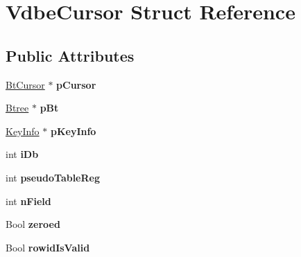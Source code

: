 \hypertarget{struct_vdbe_cursor}{\section{Vdbe\-Cursor Struct Reference}
\label{struct_vdbe_cursor}
}
\subsection*{Public Attributes}
\begin{DoxyCompactItemize}
\item 
\hypertarget{struct_vdbe_cursor_a9ecb4ab9f7374f92da69f03fc336c293}{\hyperlink{struct_bt_cursor}{Bt\-Cursor} $\ast$ {\bfseries p\-Cursor}}\label{struct_vdbe_cursor_a9ecb4ab9f7374f92da69f03fc336c293}

\item 
\hypertarget{struct_vdbe_cursor_a287db3fe6d84102fad3d69494b565e9b}{\hyperlink{struct_btree}{Btree} $\ast$ {\bfseries p\-Bt}}\label{struct_vdbe_cursor_a287db3fe6d84102fad3d69494b565e9b}

\item 
\hypertarget{struct_vdbe_cursor_a72a6c26ab2ab2ad699dfb45703ea4765}{\hyperlink{struct_key_info}{Key\-Info} $\ast$ {\bfseries p\-Key\-Info}}\label{struct_vdbe_cursor_a72a6c26ab2ab2ad699dfb45703ea4765}

\item 
\hypertarget{struct_vdbe_cursor_a1215b7b0d1bbd882d6bfb8b118712d89}{int {\bfseries i\-Db}}\label{struct_vdbe_cursor_a1215b7b0d1bbd882d6bfb8b118712d89}

\item 
\hypertarget{struct_vdbe_cursor_a8618d7c5669c83856e95b8ef72ef67b7}{int {\bfseries pseudo\-Table\-Reg}}\label{struct_vdbe_cursor_a8618d7c5669c83856e95b8ef72ef67b7}

\item 
\hypertarget{struct_vdbe_cursor_aa115a60e335e738945127141303eaedb}{int {\bfseries n\-Field}}\label{struct_vdbe_cursor_aa115a60e335e738945127141303eaedb}

\item 
\hypertarget{struct_vdbe_cursor_abcc5ef422583a743105243e2a0c7859e}{Bool {\bfseries zeroed}}\label{struct_vdbe_cursor_abcc5ef422583a743105243e2a0c7859e}

\item 
\hypertarget{struct_vdbe_cursor_a2dabf623f6e3c31aa8310c72ec1843bf}{Bool {\bfseries rowid\-Is\-Valid}}\label{struct_vdbe_cursor_a2dabf623f6e3c31aa8310c72ec1843bf}


\end{DoxyCompactItemize}
